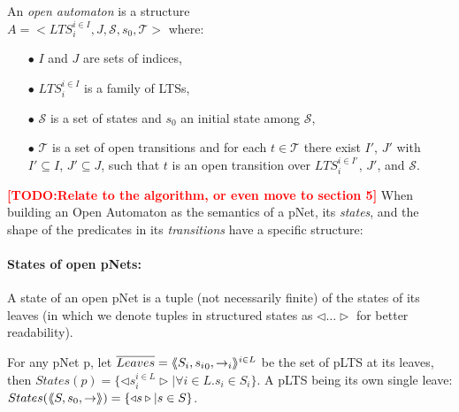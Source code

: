 \documentclass{lncs/llncs}
\newcommand{\TODO}[1]{\textcolor{red}{\textbf{[TODO:#1]}}}
\begin{document}
\begin{definition}
	\label{def:open-automaton}
	An \emph{open automaton} is a structure\\ $A =
	<LTS_i^{i\in I},J,\mathcal{S},s_0,\mathcal{T}>$ where:
	\begin{itemize}
		\item[$\bullet$]  $I$ and $J$ are  sets of indices,
		\item[$\bullet$]  $LTS_i^{i\in I}$ is a family of LTSs,
		\item[$\bullet$]   $\mathcal{S}$ is a set of states and $s_0$ an initial state
		among $\mathcal{S}$,
		\item[$\bullet$] $\mathcal{T}$ is a set of open transitions and for each
		$t\in \mathcal{T}$ there exist $I'$, $J'$ with $I'\subseteq I$, $J'
		\subseteq J$, such that $t$ is an open transition over $LTS_i^{i\in I'}$, $J'$,
		and  $\mathcal{S}$.
		
	\end{itemize}
\end{definition}
	

%

\TODO{Relate to the algorithm, or even move to section 5}
When building an Open Automaton as the semantics of a pNet, its
\emph{states}, and the shape of the predicates in its
\emph{transitions} have a specific structure:

\paragraph{States of open pNets:}\label{def-states}
  A state of an open pNet is a tuple (not necessarily finite) of the
  states of its leaves (in which we denote tuples
  in structured states as $\triangleleft\ldots\triangleright$ for better readability).

  For any pNet p, let $\overline{Leaves} = \langle\hspace{-0.58ex}\langle S_i,{s_i}_0, \to_i\rangle\hspace{-0.58ex}\rangle^{i \in L}$ be the set of pLTS at its leaves,
  then $States(p) = \{\triangleleft s_i^{i\in L}
  \triangleright| \forall i\in L. s_i \in S_i\}$.
A pLTS being its own single leave:
  $States(\langle\hspace{-0.58ex}\langle S,s_0, \to\rangle\hspace{-0.58ex}\rangle) = \{\triangleleft s \triangleright| s \in S\}$.
\end{document}
